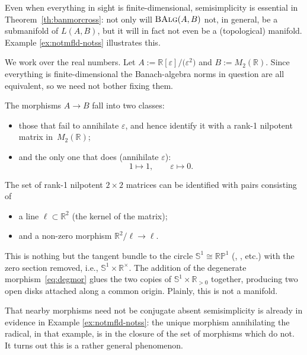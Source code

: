 \documentclass[pdftex]{sigma}
\numberwithin{equation}{section}
\newcommand\bP{{\mathbb P}}
\newcommand\bR{{\mathbb R}}
\newcommand\bS{{\mathbb S}}
\newcommand{\cat}[1]{\text{\sc #1}}
\begin{document}
Even when everything in sight is finite-dimensional, semisimplicity is essential in Theorem~\ref{th:banmorcross}: not only will $\cat{BAlg}(A,B)$ not, in general, be a submanifold of $L(A,B)$, but it will in fact not even be a (topological) manifold. Example \ref{ex:notmfld-notss} illustrates this.

\begin{Example}\label{ex:notmfld-notss}
 We work over the real numbers. Let $A:=\bR[\varepsilon]/\big(\varepsilon^2\big)$ and $B:=M_2(\bR)$. Since everything is finite-dimensional the Banach-algebra norms in question are all equivalent, so we need not bother fixing them.

 The morphisms $A\to B$ fall into two classes:
 \begin{itemize}\itemsep=0pt
 \item those that fail to annihilate $\varepsilon$, and hence identify it with a rank-1 nilpotent matrix in~$M_2(\bR)$;
 \item and the only one that does (annihilate $\varepsilon$):
 \begin{equation}\label{eq:degmor}
 1\mapsto 1,\qquad \varepsilon\mapsto 0.
 \end{equation}
 \end{itemize}
 The set of rank-1 nilpotent $2\times 2$ matrices can be identified with pairs consisting of
 \begin{itemize}\itemsep=0pt
 \item a line $\ell\subset \bR^2$ (the kernel of the matrix);
 \item and a non-zero morphism $\bR^2/\ell\to \ell$.
 \end{itemize}
 This is nothing but the tangent bundle to the circle $\bS^1\!\cong\! \bR\bP^1$ (\cite[Theorem 3.5]{3264}, \cite[Lemma~4.4]{ms-charclass}, etc.) with the zero section removed, i.e., $\bS^1\!\times \bR^{\times}$. The addition of the degenerate morphism~\eqref{eq:degmor} glues the two copies of $\bS^1\times \bR_{>0}$ together, producing two open disks attached along a common origin. Plainly, this is not a manifold.
\end{Example}

That nearby morphisms need not be conjugate absent semisimplicity is already in evidence in Example \ref{ex:notmfld-notss}: the unique morphism annihilating the radical, in that example, is in the closure of the set of morphisms which do not. It turns out this is a rather general phenomenon.
\end{document}
